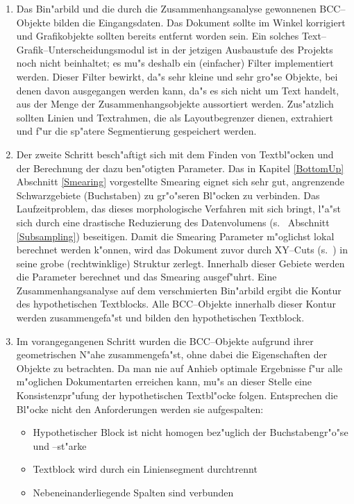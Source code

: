 \begin{enumerate}
  \item Das Bin"arbild und die durch die Zusammenhangsanalyse gewonnenen BCC--Objekte bilden
        die Eingangsdaten. Das Dokument sollte im Winkel korrigiert und Grafik\-objekte
        sollten bereits entfernt worden sein. Ein solches Text--Grafik--Unter\-scheid\-ungs\-modul ist
        in der jetzigen Ausbaustufe des Projekts noch nicht beinhaltet; es mu"s deshalb ein
        (einfacher) Filter implementiert werden. Dieser Filter bewirkt, da"s sehr kleine und sehr
        gro"se Objekte, bei denen davon ausgegangen werden kann, da"s es sich nicht um Text handelt,
        aus der Menge der Zusammenhangsobjekte aussortiert werden. Zus"atzlich
        sollten Linien und Textrahmen, die als Layoutbegrenzer dienen, extrahiert und f"ur die sp"atere
        Segmentierung gespeichert werden.

  \item Der zweite Schritt besch"aftigt sich mit dem Finden von Textbl"ocken und der Berechnung der
        dazu ben"otigten Parameter. Das in Kapitel \ref{BottomUp} Abschnitt \ref{Smearing} vorgestellte Smearing eignet sich
        sehr gut, angrenzende Schwarzgebiete (Buchstaben) zu gr"o"seren Bl"ocken zu verbinden.
        Das Laufzeitproblem, das dieses morphologische Verfahren mit sich bringt, l"a"st sich
        durch eine drastische Reduzierung des Datenvolumens (s.\  Abschnitt \ref{Subsampling}) beseitigen.
        Damit die Smearing Parameter m"oglichst lokal berechnet werden k"onnen, wird das Dokument zuvor
        durch XY--Cuts (s.\ ) in seine grobe (rechtwinklige) Struktur zerlegt.
        Innerhalb dieser Gebiete werden die Parameter berechnet und das Smearing ausgef"uhrt.
        Eine Zusammenhangsanalyse auf dem verschmierten Bin"arbild ergibt die Kontur des
        hypothetischen Textblocks. Alle BCC--Objekte innerhalb dieser Kontur
        werden zusammengefa"st und bilden den hypothetischen Textblock.

  \item Im vorangegangenen Schritt wurden die BCC--Objekte aufgrund ihrer geometrischen N"ahe
        zusammengefa"st, ohne dabei die Eigenschaften der Objekte zu betrachten.
        Da man nie auf Anhieb optimale Ergebnisse f"ur alle m"oglichen Dokumentarten erreichen kann,
        mu"s an dieser Stelle eine Konsistenzpr"ufung der hypothetischen Textbl"ocke
        folgen. Entsprechen die Bl"ocke nicht den Anforderungen werden sie
        aufgespalten:
        \begin{itemize}
          \item Hypothetischer Block ist nicht homogen bez"uglich der Buchstabengr"o"se und --st"arke
          \item Textblock wird durch ein Liniensegment durchtrennt
          \item Nebeneinanderliegende Spalten sind verbunden
        \end{itemize}


\end{enumerate}
